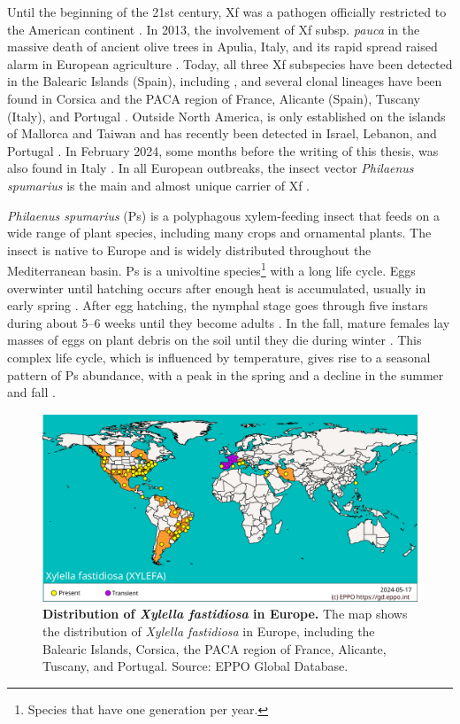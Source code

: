Until the beginning of the 21st century, Xf was a pathogen officially
restricted to the American continent \cite{almeida2015plant}. In 2013, the
involvement of Xf subsp. \textit{pauca} in the massive death of ancient olive
trees in Apulia, Italy, and its rapid spread raised alarm in European
agriculture \cite{Saponari2013}. Today, all three Xf subspecies
have been detected in the Balearic Islands (Spain), including \xf{}, and
several clonal lineages have been found in Corsica and the PACA region of
France, Alicante (Spain), Tuscany (Italy), and Portugal
\cite{Olmo2021,denance2017several,Noales2021}. Outside North
America, \xf{} is only established on the islands of Mallorca and Taiwan and
has recently been detected in Israel, Lebanon, and Portugal
\cite{zecharia2022xylella,carvalho2022dispersion}. In February 2024, some
months before the writing of this thesis, \xf{} was also found in Italy
\cite{Xf_detection_italy}. In all European outbreaks, the insect vector
\textit{Philaenus spumarius} is the main and almost unique carrier of Xf
\cite{cornara2018philaenus}.

\textit{Philaenus spumarius} (Ps) is a polyphagous xylem-feeding insect that
feeds
on a wide range of plant species, including many crops and ornamental plants.
The insect is native to Europe and is widely distributed throughout the
Mediterranean basin. Ps is a univoltine species\footnote{Species that have
  one
  generation per year.} with a long life cycle. Eggs overwinter until
hatching
occurs after enough heat is accumulated, usually in early spring
\cite{morente2018distribution}. After egg hatching, the  nymphal stage goes
through five instars during about 5–6 weeks until they become adults
\cite{weaver1954meadow}. In the fall, mature females lay masses of eggs on
plant debris on the soil until they die during winter \cite{Lago2023}. This
complex life cycle, which is influenced by temperature, gives rise to a
seasonal pattern of Ps abundance, with a peak in the spring and a decline in
the summer and fall \cite{Lopez2021}.

\begin{figure}[H]
  \centering
  \includegraphics[width=\textwidth]{Figures/Xf_distribution.pdf}
  \caption[Distribution of \textit{Xylella fastidiosa} in Europe]{
    \textbf{Distribution of \textit{Xylella fastidiosa} in Europe.} The map
    shows the distribution of \textit{Xylella fastidiosa} in Europe,
    including
    the Balearic Islands, Corsica, the PACA region of France, Alicante,
    Tuscany, and Portugal. Source: EPPO Global Database.}
  \label{fig:Xf_distribution}
\end{figure}

